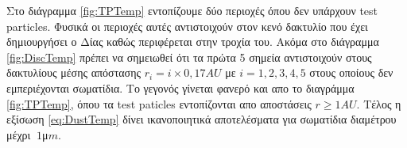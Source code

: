 Στο διάγραμμα \ref{fig:TPTemp} εντοπίζουμε δύο περιοχές όπου δεν υπάρχουν {\en test particles}. Φυσικά οι περιοχές αυτές αντιστοιχούν στον κενό δακτυλίο που έχει δημιουργήσει ο Δίας καθώς περιφέρεται στην τροχία του. Ακόμα στο διάγραμμα \ref{fig:DiscTemp} πρέπει να σημειωθεί ότι τα πρώτα 5 σημεία αντιστοιχούν στους δακτυλίους μέσης απόστασης $r_i =i\times0,17 AU$ με $i=1,2,3,4,5$ στους οποίους δεν εμπεριέχονται σωματίδια. Το γεγονός γίνεται φανερό και απο το διαγράμμα \ref{fig:TPTemp}, όπου τα {\en test paticles} εντοπίζονται απο αποστάσεις $r \geq 1AU$. Τέλος η εξίσωση \eqref{eq:DustTemp} δίνει ικανοποιητικά αποτελέσματα για σωματίδια διαμέτρου μέχρι $~1$μ$m$.\\








